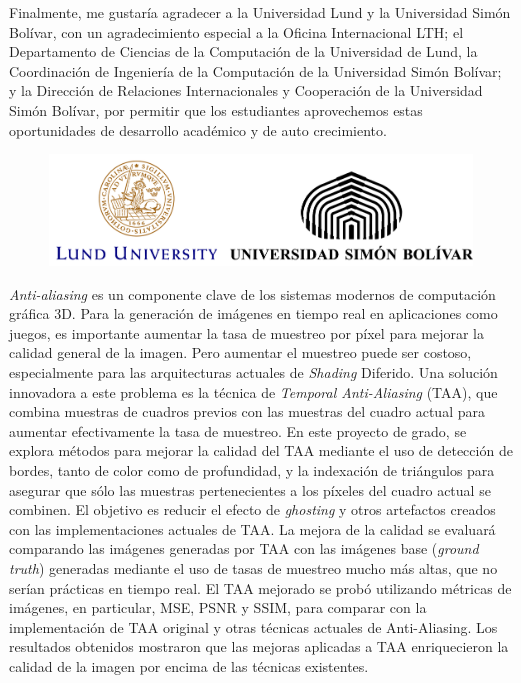 \documentclass[pregrado]{tesis-usb} %
\begin{document}
Finalmente, me gustaría agradecer a la Universidad Lund y la Universidad Simón Bolívar, con un agradecimiento especial a la Oficina Internacional LTH; el Departamento de Ciencias de la Computación de la Universidad de Lund, la Coordinación de Ingeniería de la Computación de la Universidad Simón Bolívar; y la Dirección de Relaciones Internacionales y Cooperación de la Universidad Simón Bolívar, por permitir que los estudiantes aprovechemos estas oportunidades de desarrollo académico y de auto crecimiento.

\begin{figure}[!hbt]
	\centering
	\includegraphics[scale=0.3]{images/univ_logotypes.png}
\end{figure}

\begin{resumen}
	\textit{Anti-aliasing} es un componente clave de los sistemas modernos de computación gráfica 3D. Para la generación de imágenes en tiempo real en aplicaciones como juegos, es importante aumentar la tasa de muestreo por píxel para mejorar la calidad general de la imagen. Pero aumentar el muestreo puede ser costoso, especialmente para las arquitecturas actuales de \textit{Shading} Diferido. Una solución innovadora a este problema es la técnica de \textit{Temporal Anti-Aliasing} (TAA), que combina muestras de cuadros previos con las muestras del cuadro actual para aumentar efectivamente la tasa de muestreo. En este proyecto de grado, se explora métodos para mejorar la calidad del TAA mediante el uso de detección de bordes, tanto de color como de profundidad, y la indexación de triángulos para asegurar que sólo las muestras pertenecientes a los píxeles del cuadro actual se combinen. El objetivo es reducir el efecto de \textit{ghosting} y otros artefactos creados con las implementaciones actuales de TAA. La mejora de la calidad se evaluará comparando las imágenes generadas por TAA con las imágenes base (\textit{ground truth}) generadas mediante el uso de tasas de muestreo mucho más altas, que no serían prácticas en tiempo real. El TAA mejorado se probó utilizando métricas de imágenes, en particular, MSE, PSNR y SSIM, para comparar con la implementación de TAA original y otras técnicas actuales de Anti-Aliasing. Los resultados obtenidos mostraron que las mejoras aplicadas a TAA enriquecieron la calidad de la imagen por encima de las técnicas existentes. \\
	\vspace{2cm}\par{}
\end{resumen}
\end{document}
